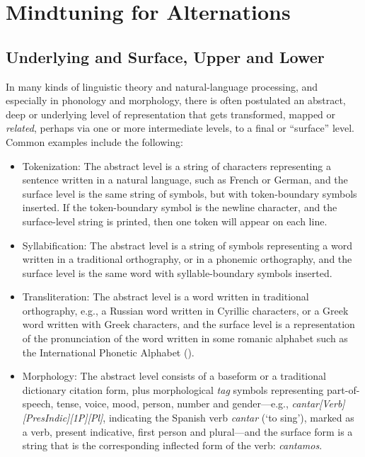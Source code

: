\section{Mindtuning for Alternations}

\subsection{Underlying and Surface, Upper and Lower}

In many kinds of linguistic theory and natural-language processing, and especially in phonology and morphology, there
is often postulated an abstract, deep or underlying level of
representation
that gets transformed, mapped or \emph{related}, perhaps
via one or more intermediate levels, to a final or ``surface'' level.   Common examples include the following:

\begin{itemize}
\item
Tokenization:  The abstract level is a string of characters representing a 
sentence written in a natural language,
such as French or German, and the surface level is
the same string of symbols, but with token-boundary symbols inserted.  If the token-boundary symbol is the
newline character, and the surface-level string is printed, then one token will appear on each line.
\item
Syllabification:  The abstract level is a string of symbols representing a
word written in a traditional orthography, or in a phonemic orthography, and the
surface level is the same word with syllable-boundary symbols inserted.
\item
Transliteration:  The abstract level is a word written in traditional
orthography, e.g.,
a Russian word written in
Cyrillic characters, or a Greek word written with Greek characters, 
and the surface level is a representation of
the pronunciation of the word written in some romanic alphabet such as
the International Phonetic Alphabet ().
\item
Morphology:  The abstract level consists of a baseform or a traditional
dictionary citation form, plus
morphological \emph{tag} symbols representing part-of-speech, tense, voice,
mood, person, number and gender---e.g., \emph{cantar[Verb][PresIndic][1P][Pl]}, indicating the
Spanish verb \emph{cantar} (`to sing'), marked as a verb, present
indicative, first person and plural---and the surface form is a string
that is the
corresponding inflected form of the verb: \emph{cantamos}.
\end{itemize}

